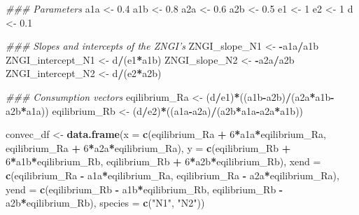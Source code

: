 \documentclass[
]{book}
\newenvironment{Shaded}{\begin{snugshade}}{\end{snugshade}}
\newcommand{\CommentTok}[1]{\textcolor[rgb]{0.56,0.35,0.01}{\textit{#1}}}
\newcommand{\DataTypeTok}[1]{\textcolor[rgb]{0.13,0.29,0.53}{#1}}
\newcommand{\DecValTok}[1]{\textcolor[rgb]{0.00,0.00,0.81}{#1}}
\newcommand{\FloatTok}[1]{\textcolor[rgb]{0.00,0.00,0.81}{#1}}
\newcommand{\KeywordTok}[1]{\textcolor[rgb]{0.13,0.29,0.53}{\textbf{#1}}}
\newcommand{\NormalTok}[1]{#1}
\newcommand{\OperatorTok}[1]{\textcolor[rgb]{0.81,0.36,0.00}{\textbf{#1}}}
\newcommand{\StringTok}[1]{\textcolor[rgb]{0.31,0.60,0.02}{#1}}
\begin{document}
\begin{Shaded}
\begin{Highlighting}[]
\CommentTok{### Parameters}
\NormalTok{a1a <-}\StringTok{ }\FloatTok{0.4}
\NormalTok{a1b <-}\StringTok{ }\FloatTok{0.8}
\NormalTok{a2a <-}\StringTok{ }\FloatTok{0.6}
\NormalTok{a2b <-}\StringTok{ }\FloatTok{0.5}
\NormalTok{e1 <-}\StringTok{ }\DecValTok{1}
\NormalTok{e2 <-}\StringTok{ }\DecValTok{1}
\NormalTok{d <-}\StringTok{ }\FloatTok{0.1}

\CommentTok{### Slopes and intercepts of the ZNGI's}
\NormalTok{ZNGI_slope_N1 <-}\StringTok{ }\OperatorTok{-}\NormalTok{a1a}\OperatorTok{/}\NormalTok{a1b}
\NormalTok{ZNGI_intercept_N1 <-}\StringTok{ }\NormalTok{d}\OperatorTok{/}\NormalTok{(e1}\OperatorTok{*}\NormalTok{a1b)  }
\NormalTok{ZNGI_slope_N2 <-}\StringTok{ }\OperatorTok{-}\NormalTok{a2a}\OperatorTok{/}\NormalTok{a2b}
\NormalTok{ZNGI_intercept_N2 <-}\StringTok{ }\NormalTok{d}\OperatorTok{/}\NormalTok{(e2}\OperatorTok{*}\NormalTok{a2b)}

\CommentTok{### Consumption vectors}
\NormalTok{eqilibrium_Ra <-}\StringTok{ }\NormalTok{(d}\OperatorTok{/}\NormalTok{e1)}\OperatorTok{*}\NormalTok{((a1b}\OperatorTok{-}\NormalTok{a2b)}\OperatorTok{/}\NormalTok{(a2a}\OperatorTok{*}\NormalTok{a1b}\OperatorTok{-}\NormalTok{a2b}\OperatorTok{*}\NormalTok{a1a))}
\NormalTok{eqilibrium_Rb <-}\StringTok{ }\NormalTok{(d}\OperatorTok{/}\NormalTok{e2)}\OperatorTok{*}\NormalTok{((a1a}\OperatorTok{-}\NormalTok{a2a)}\OperatorTok{/}\NormalTok{(a2b}\OperatorTok{*}\NormalTok{a1a}\OperatorTok{-}\NormalTok{a2a}\OperatorTok{*}\NormalTok{a1b))}

\NormalTok{convec_df <-}\StringTok{ }\KeywordTok{data.frame}\NormalTok{(}\DataTypeTok{x =} \KeywordTok{c}\NormalTok{(eqilibrium_Ra }\OperatorTok{+}\StringTok{ }\DecValTok{6}\OperatorTok{*}\NormalTok{a1a}\OperatorTok{*}\NormalTok{eqilibrium_Ra, }
\NormalTok{                              eqilibrium_Ra }\OperatorTok{+}\StringTok{ }\DecValTok{6}\OperatorTok{*}\NormalTok{a2a}\OperatorTok{*}\NormalTok{eqilibrium_Ra),}
                        \DataTypeTok{y =} \KeywordTok{c}\NormalTok{(eqilibrium_Rb }\OperatorTok{+}\StringTok{ }\DecValTok{6}\OperatorTok{*}\NormalTok{a1b}\OperatorTok{*}\NormalTok{eqilibrium_Rb, }
\NormalTok{                              eqilibrium_Rb }\OperatorTok{+}\StringTok{ }\DecValTok{6}\OperatorTok{*}\NormalTok{a2b}\OperatorTok{*}\NormalTok{eqilibrium_Rb),}
                        \DataTypeTok{xend =} \KeywordTok{c}\NormalTok{(eqilibrium_Ra }\OperatorTok{-}\StringTok{ }\NormalTok{a1a}\OperatorTok{*}\NormalTok{eqilibrium_Ra, }
\NormalTok{                              eqilibrium_Ra }\OperatorTok{-}\StringTok{ }\NormalTok{a2a}\OperatorTok{*}\NormalTok{eqilibrium_Ra),}
                        \DataTypeTok{yend =} \KeywordTok{c}\NormalTok{(eqilibrium_Rb }\OperatorTok{-}\StringTok{ }\NormalTok{a1b}\OperatorTok{*}\NormalTok{eqilibrium_Rb, }
\NormalTok{                              eqilibrium_Rb }\OperatorTok{-}\StringTok{ }\NormalTok{a2b}\OperatorTok{*}\NormalTok{eqilibrium_Rb),}
                        \DataTypeTok{species =} \KeywordTok{c}\NormalTok{(}\StringTok{"N1"}\NormalTok{, }\StringTok{"N2"}\NormalTok{))}


\end{Highlighting}
\end{Shaded}
\end{document}

